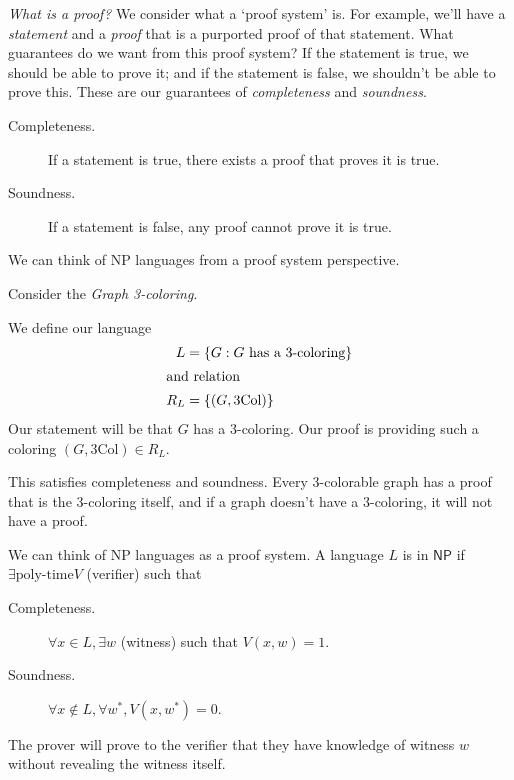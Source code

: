 \emph{What is a proof?} We consider what a `proof system' is. For example, we'll have a \emph{statement} and a \emph{proof} that is a purported proof of that statement. What guarantees do we want from this proof system? If the statement is true, we should be able to prove it; and if the statement is false, we shouldn't be able to prove this. These are our guarantees of \emph{completeness} and \emph{soundness}.
\begin{description}
    \item[Completeness.] If a statement is true, there exists a proof that proves it is true.
    \item[Soundness.] If a statement is false, any proof cannot prove it is true.
\end{description}

We can think of NP languages from a proof system perspective.

\begin{example}
    Consider the \emph{Graph 3-coloring}.


    We define our language
    \begin{align*}
        L   & = \{G: G\text{ has a 3-coloring}\} \\
        \intertext{and relation}
        R_L & = \{(G, \textrm{3Col})\}
    \end{align*}
    Our statement will be that $G$ has a 3-coloring. Our proof is providing such a coloring $(G, \mathrm{3Col})\in R_L$.

    This satisfies completeness and soundness. Every 3-colorable graph has a proof that is the 3-coloring itself, and if a graph doesn't have a 3-coloring, it will not have a proof.
\end{example}

We can think of NP languages as a proof system. A language $L$ is in $\mathsf{NP}$ if $\exists \text{poly-time} V$ (verifier) such that
\begin{description}
    \item[Completeness.] $\forall x\in L, \exists w$ (witness) such that $V(x, w) = 1$.
    \item[Soundness.] $\forall x\not\in L, \forall w^*, V(x, w^*) = 0$.
\end{description}
The prover will prove to the verifier that they have knowledge of witness $w$ without revealing the witness itself.


